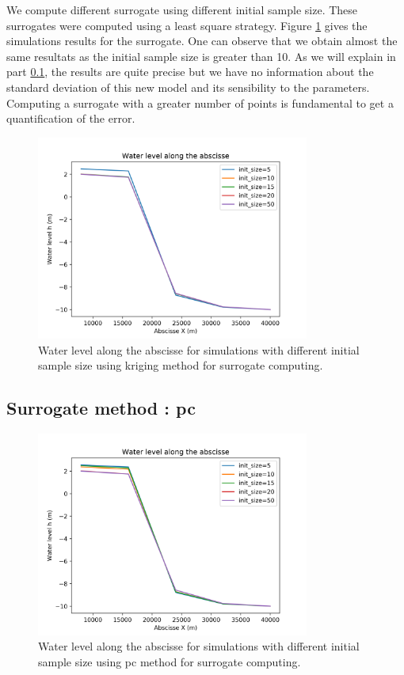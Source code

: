 \documentclass[hidelinks,12pt]{article}
\begin{document}
We compute different surrogate using different initial sample size. These surrogates were computed using a least square strategy. Figure \ref{influence_init_size_method_surrogate_kriging} gives the simulations results for the surrogate. One can observe that we obtain almost the same resultats as the initial sample size is greater than 10. As we will explain in part \ref{}, the results are quite precise but we have no information about the standard deviation of this new model and its sensibility to the parameters. Computing a surrogate with a greater number of points is fundamental to get a quantification of the error.

\begin{figure}
  \centering
  \includegraphics[width=0.8\textwidth]{images/influence_init_size_method_surrogate_kriging.png}
  \caption{Water level along the abscisse for simulations with different initial sample size using kriging method for surrogate computing.}
  	\label{influence_init_size_method_surrogate_kriging}
\end{figure}

\subsection{Surrogate method : pc}

\begin{figure}
  \centering
  \includegraphics[width=0.8\textwidth]{images/influence_init_size_method_surrogate_pc.png}
  \caption{Water level along the abscisse for simulations with different initial sample size using pc method for surrogate computing.}
  	\label{influence_init_size_method_surrogate_pc}
\end{figure}
\end{document}
